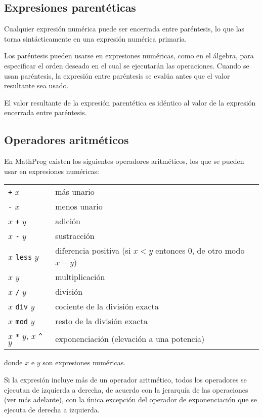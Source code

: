 \documentclass[11pt,spanish]{report}
\begin{document}
\subsection{Expresiones parentéticas}

Cualquier expresión numérica puede ser encerrada entre paréntesis, lo que las torna sintácticamente en una expresión numérica primaria.

Los paréntesis pueden usarse en expresiones numéricas, como en el álgebra, para especificar el orden deseado en el cual se ejecutarán las operaciones. Cuando se usan paréntesis, la expresión entre paréntesis se evalúa antes que el valor resultante sea usado.

El valor resultante de la expresión parentética es idéntico al valor de la expresión encerrada entre paréntesis.

\subsection{Operadores aritméticos}

En MathProg existen los siguientes operadores aritméticos, los que se pueden usar en expresiones numéricas:

\begin{tabular}{@{}ll@{}}
{\tt +} $x$&más unario\\
{\tt -} $x$&menos unario\\
$x$ {\tt +} $y$&adición\\
$x$ {\tt -} $y$&sustracción\\
$x$ {\tt less} $y$&diferencia positiva (si $x<y$ entonces 0, de otro modo $x-y$)\\
$x$ {\tt *} $y$&multiplicación\\
$x$ {\tt /} $y$&división\\
$x$ {\tt div} $y$&cociente de la división exacta\\
$x$ {\tt mod} $y$&resto de la división exacta\\
$x$ {\tt **} $y$, $x$ {\tt\textasciicircum} $y$&exponenciación (elevación a una potencia)\\
\end{tabular}

\noindent donde $x$ e $y$ son expresiones numéricas.

Si la expresión incluye más de un operador aritmético, todos los operadores se ejecutan de izquierda a derecha, de acuerdo con la jerarquía de las operaciones (ver más adelante), con la única excepción del operador de exponenciación que se ejecuta de derecha a izquierda.
\end{document}
